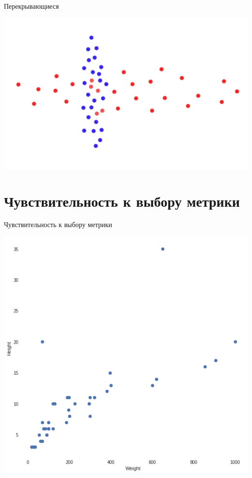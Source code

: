 \documentclass[10pt]{beamer}
\begin{document}
\begin{frame}{Перекрывающиеся}
	\begin{center}
	  \includegraphics[height=0.6 \textheight, keepaspectratio = true]{images/cluster6}  
	\end{center}
\end{frame}

\section{Чувствительность к выбору метрики}

\begin{frame}{Чувствительность к выбору метрики}
	\begin{center}
	  \includegraphics[height=0.8 \textheight, keepaspectratio = true]{images/weight_height1}  
	\end{center}
\end{frame}
\end{document}
